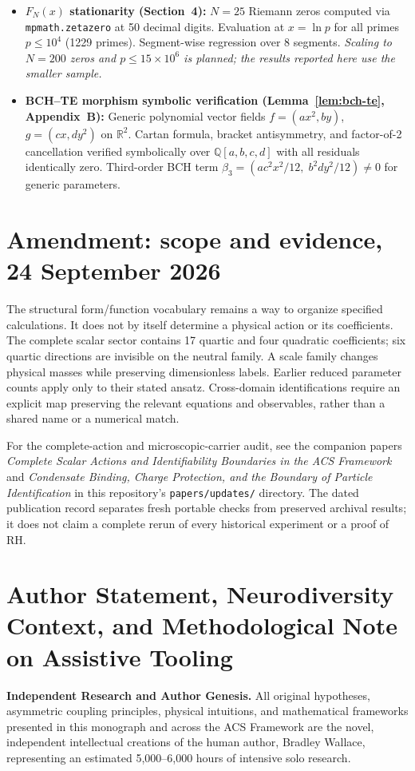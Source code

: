 \documentclass[12pt,a4paper]{article}
\theoremstyle{plain}
\theoremstyle{definition}
\theoremstyle{remark}
\begin{document}
\begin{itemize}[noitemsep]
  \item \textbf{$F_N(x)$ stationarity (Section~4):}
    $N = 25$ Riemann zeros computed via \texttt{mpmath.zetazero} at 50
    decimal digits.  Evaluation at $x = \ln p$ for all primes $p \leq 10^4$
    (1229 primes).  Segment-wise regression over 8 segments.
    \emph{Scaling to $N = 200$ zeros and $p \leq 15 \times 10^6$ is planned;
    the results reported here use the smaller sample.}

  \item \textbf{BCH--TE morphism symbolic verification (Lemma~\ref{lem:bch-te}, Appendix~B):}
    Generic polynomial vector fields $f = (ax^2, by)$, $g = (cx, dy^2)$
    on $\mathbb{R}^2$.  Cartan formula, bracket antisymmetry, and factor-of-2
    cancellation verified symbolically over $\mathbb{Q}[a,b,c,d]$ with all
    residuals identically zero.  Third-order BCH term
    $\beta_3 = (ac^2x^2/12,\; b^2dy^2/12) \neq 0$ for generic parameters.
\end{itemize}


\section*{Amendment: scope and evidence, 24 September 2026}
The structural form/function vocabulary remains a way to organize specified calculations. It does not by itself determine a physical action or its coefficients. The complete scalar sector contains 17 quartic and four quadratic coefficients; six quartic directions are invisible on the neutral family. A scale family changes physical masses while preserving dimensionless labels. Earlier reduced parameter counts apply only to their stated ansatz. Cross-domain identifications require an explicit map preserving the relevant equations and observables, rather than a shared name or a numerical match.

For the complete-action and microscopic-carrier audit, see the companion
papers \emph{Complete Scalar Actions and Identifiability Boundaries in the ACS
Framework} and \emph{Condensate Binding, Charge Protection, and the Boundary
of Particle Identification} in this repository's \texttt{papers/updates/}
directory. The dated publication record separates fresh portable checks
from preserved archival results; it does not claim a complete rerun of every
historical experiment or a proof of RH.

\section*{Author Statement, Neurodiversity Context, and Methodological Note on Assistive Tooling}
\noindent\textbf{Independent Research and Author Genesis.} 
All original hypotheses, asymmetric coupling principles, physical intuitions, and mathematical frameworks presented in this monograph and across the ACS Framework are the novel, independent intellectual creations of the human author, Bradley Wallace, representing an estimated 5,000--6,000 hours of intensive solo research.
\end{document}
